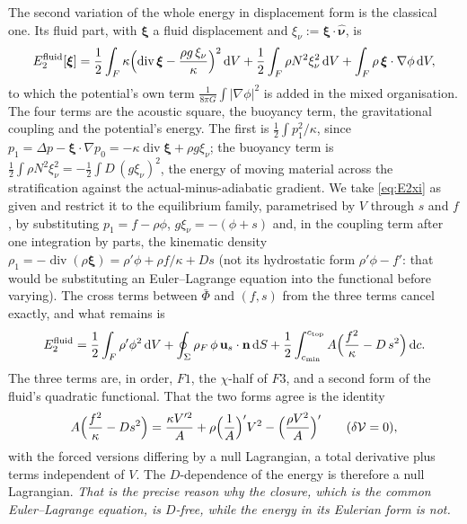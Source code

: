 \documentclass[11pt]{article}
\theoremstyle{definition}
\theoremstyle{remark}
\newcommand{\bu}{\mathbf{u}}
\newcommand{\bn}{\mathbf{n}}
\newcommand{\bxi}{\boldsymbol{\xi}}
\newcommand{\dS}{\,\mathrm{d}S}
\newcommand{\dV}{\,\mathrm{d}V}
\newcommand{\dc}{\,\mathrm{d}c}
\newcommand{\Div}{\operatorname{div}}
\newcommand{\Vol}{\mathcal V}
\newcommand{\nuh}{\hat{\boldsymbol{\nu}}}
\begin{document}
The second variation of the whole energy in displacement form is the
classical one. Its fluid part, with $\bxi$ a fluid displacement and
$\xi_\nu := \bxi\cdot\nuh$, is
\begin{equation}
  E_2^{\mathrm{fluid}}[\bxi]
  = \frac12\int_F\kappa\Bigl(\Div\bxi - \frac{\rho g\,\xi_\nu}{\kappa}\Bigr)^2\dV
  + \frac12\int_F\rho N^2\xi_\nu^2\dV
  + \int_F\rho\,\bxi\cdot\nabla\phi\dV ,
  \label{eq:E2xi}
\end{equation}
to which the potential's own term $\tfrac{1}{8\pi G}\int|\nabla\phi|^2$
is added in the mixed organisation. The four terms are the acoustic
square, the buoyancy term, the gravitational coupling and the
potential's energy. The first is $\tfrac12\int p_1^2/\kappa$, since $p_1
= \Delta p - \bxi\cdot\nabla p_0 = -\kappa\Div\bxi + \rho g\xi_\nu$; the
buoyancy term is $\tfrac12\int\rho N^2\xi_\nu^2 = -\tfrac12\int D\,
(g\xi_\nu)^2$, the energy of moving material across the stratification
against the actual-minus-adiabatic gradient. We take \eqref{eq:E2xi} as
given and restrict it to the equilibrium family, parametrised by $V$
through $s$ and $f$, by substituting $p_1 = f - \rho\phi$, $g\xi_\nu =
-(\phi + s)$ and, in the coupling term after one integration by parts,
the kinematic density $\rho_1 = -\Div(\rho\bxi) = \rho'\phi + \rho
f/\kappa + Ds$ (not its hydrostatic form $\rho'\phi - f'$: that would be
substituting an Euler--Lagrange equation into the functional before
varying). The cross terms between $\bar\Phi$ and $(f, s)$ from the
three terms cancel exactly, and what remains is
\begin{equation}
  E_2^{\mathrm{fluid}}
  = \frac12\int_F\rho'\phi^2\dV
  + \oint_\Sigma\rho_F\,\phi\,\bu_s\cdot\bn\dS
  + \frac12\int_{c_{\min}}^{c_{\mathrm{top}}}A\Bigl(\frac{f^2}{\kappa} - D\,s^2\Bigr)\dc .
  \label{eq:E2state}
\end{equation}
The three terms are, in order, $F1$, the $\chi$-half of $F3$, and a
second form of the fluid's quadratic functional. That the two forms
agree is the identity
\begin{equation}
  A\Bigl(\frac{f^2}{\kappa} - Ds^2\Bigr)
  = \frac{\kappa V'^2}{A} + \rho\Bigl(\frac1A\Bigr)'V^2
  - \Bigl(\frac{\rho V^2}{A}\Bigr)'
  \qquad(\delta\Vol = 0),
  \label{eq:nulllag}
\end{equation}
with the forced versions differing by a null Lagrangian, a total
derivative plus terms independent of $V$. The $D$-dependence of the
energy is therefore a null Lagrangian. \emph{That is the precise reason
why the closure, which is the common Euler--Lagrange equation, is
$D$-free, while the energy in its Eulerian form is not.}
\end{document}
